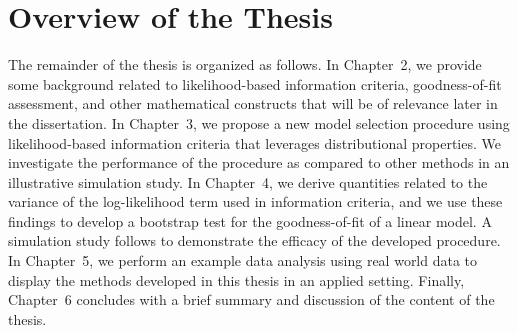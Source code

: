		\section{Overview of the Thesis}
		The remainder of the thesis is organized as follows. In Chapter~2, we provide some background related to likelihood-based information criteria, goodness-of-fit assessment, and other mathematical
		constructs that will be of relevance later in the dissertation. In Chapter~3, we propose a new model selection procedure using likelihood-based information criteria that leverages distributional
		properties. We investigate the performance of the procedure as compared to other methods in an illustrative simulation study.  In Chapter~4, we derive quantities related to the variance of the
		log-likelihood term used in information criteria, and we use these findings to develop a bootstrap test for the goodness-of-fit of a linear model. A simulation study follows to demonstrate the
		efficacy of the developed procedure. In Chapter~5, we perform an example data analysis using real world data to display the methods developed in this thesis in an applied setting.
		Finally, Chapter~6 concludes with a brief summary and discussion of the content of the thesis. 
		